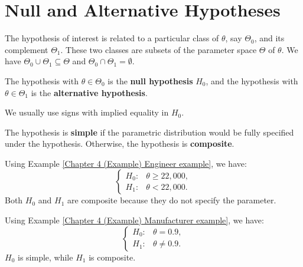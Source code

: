 \documentclass{huhtakm-template-book-v2}
\begin{document}
\section{Null and Alternative Hypotheses}
    The hypothesis of interest is related to a particular class of $\theta$, say $\Theta_{0}$, and its complement $\Theta_{1}$. These two classes are subsets of the parameter space $\Theta$ of $\theta$. We have $\Theta_{0}\cup\Theta_{1}\subseteq\Theta$ and $\Theta_{0}\cap\Theta_{1}=\emptyset$.
    \begin{defn}
        The hypothesis with $\theta\in\Theta_{0}$ is the \textbf{null hypothesis} $H_{0}$, and the hypothesis with $\theta\in\Theta_{1}$ is the \textbf{alternative hypothesis}.
    \end{defn}
    \begin{rem}
        We usually use signs with implied equality in $H_{0}$.
    \end{rem}
    \begin{defn}
        The hypothesis is \textbf{simple} if the parametric distribution would be fully specified under the hypothesis. Otherwise, the hypothesis is \textbf{composite}.
    \end{defn}
    \begin{eg}
        Using Example \ref{Chapter 4 (Example) Engineer example}, we have:
        \begin{equation*}
            \begin{cases}
                H_{0}: & \theta\geq 22,000,\\
                H_{1}: & \theta<22,000.
            \end{cases}
        \end{equation*}
        Both $H_{0}$ and $H_{1}$ are composite because they do not specify the parameter.
    \end{eg}
    \begin{eg}
        Using Example \ref{Chapter 4 (Example) Manufacturer example}, we have:
        \begin{equation*}
            \begin{cases}
                H_{0}: &\theta=0.9,\\
                H_{1}: &\theta\neq 0.9.
            \end{cases}
        \end{equation*}
        $H_{0}$ is simple, while $H_{1}$ is composite.
    \end{eg}
    \newpage
    
\end{document}
